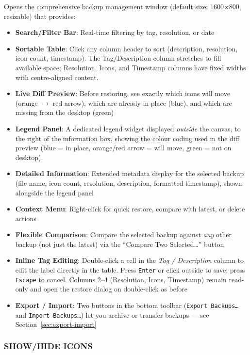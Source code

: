 \documentclass[a4paper,11pt]{article}
\begin{document}
Opens the comprehensive backup management window (default size: 1600×800,
resizable) that provides:
\begin{itemize}
  \item \textbf{Search/Filter Bar}: Real-time filtering by tag,
    resolution, or date
  \item \textbf{Sortable Table}: Click any column header to sort
    (description, resolution, icon count, timestamp). The Tag/Description
    column stretches to fill available space; Resolution, Icons, and
    Timestamp columns have fixed widths with centre-aligned content.
  \item \textbf{Live Diff Preview}: Before restoring, see exactly
    which icons will move (orange $\rightarrow$ red arrow), which are
    already in place (blue), and which are missing from the desktop (green)
  \item \textbf{Legend Panel}: A dedicated legend widget displayed
    \textit{outside} the canvas, to the right of the information box,
    showing the colour coding used in the diff preview (blue = in place,
    orange/red arrow = will move, green = not on desktop)
  \item \textbf{Detailed Information}: Extended metadata display for
    the selected backup (file name, icon count, resolution, description,
    formatted timestamp), shown alongside the legend panel
  \item \textbf{Context Menu}: Right-click for quick restore,
    compare with latest, or delete actions
  \item \textbf{Flexible Comparison}: Compare the selected backup
    against \textit{any} other backup (not just the latest) via the
    ``Compare Two Selected\ldots'' button
  \item \textbf{Inline Tag Editing}: Double-click a cell in the
    \textit{Tag / Description} column to edit the label directly in the
    table. Press \texttt{Enter} or click outside to save; press
    \texttt{Escape} to cancel. Columns 2--4 (Resolution, Icons,
    Timestamp) remain read-only and open the restore dialog on
    double-click as before
  \item \textbf{Export / Import}: Two buttons in the bottom toolbar
    (\texttt{Export Backups\ldots} and \texttt{Import Backups\ldots})
    let you archive or transfer backups --- see
    Section~\ref{sec:export-import}
\end{itemize}

\subsubsection{SHOW/HIDE ICONS}
\end{document}
